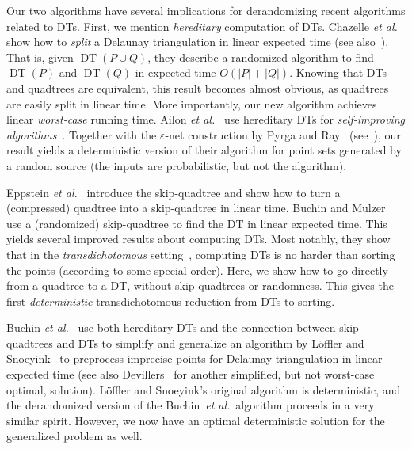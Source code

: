 \documentclass[11pt]{paper}
\newcommand {\etal} {\textit {et al.}}
\newcommand {\eps} {\varepsilon}
\DeclareMathOperator {\DT}{DT}
\begin{document}
    Our two algorithms have several implications for derandomizing recent
    algorithms related to DTs. First,
    we mention \emph{hereditary} computation of DTs.
    Chazelle \etal~\cite {ChazelleDeHuMoSaTe02} show how to \emph{split} a Delaunay
    triangulation in linear expected time (see also~\cite{ChazelleMu11}).
    That is, given $\DT(P \cup Q)$,
    they describe a randomized algorithm to find $\DT(P)$ and
    $\DT(Q)$ in expected time $O(|P| + |Q|)$. Knowing that DTs
    and quadtrees are equivalent, this result becomes almost obvious, as quadtrees
    are easily split in linear time. More importantly, our
    new algorithm achieves linear \emph{worst-case} running time.
Ailon \etal~\cite{AilonChClLiMuSe11} use hereditary
    DTs for 
    \emph{self-improving algorithms}~\cite{AilonChClLiMuSe11}.
    Together with the $\eps$-net construction by Pyrga and Ray~\cite{PyrgaRa08}
    (see~\cite[Appendix~A]{AilonChClLiMuSe11}),
    our result yields a deterministic version of their algorithm for
    point sets generated by a random source (the inputs are probabilistic,
    but not the algorithm).

    Eppstein \etal~\cite {EppsteinGoSu08} introduce the skip-quadtree and show
    how to turn a (compressed) quadtree into a skip-quadtree in linear
    time.  Buchin and Mulzer~\cite{BuchinMu11} use a
    (randomized) skip-quadtree to find the DT in linear
    expected time.
    This yields several improved results
    about computing DTs. Most notably, they show
    that in the \emph{transdichotomous} 
    setting~\cite{ChanPa09,ChanPa10,FredmanWi94}, computing DTs
    is no harder than sorting the points (according to some special order).
    Here, we show how to go directly from a quadtree
    to a DT, without skip-quadtrees or randomness.
    This gives the first \emph{deterministic} transdichotomous reduction from
    DTs to sorting.

    Buchin \etal~\cite {BuchinLoMoMuXX} use both hereditary
    DTs and the connection between skip-quadtrees and DTs
    to simplify and generalize
    an algorithm by L{\"o}ffler and Snoeyink~\cite{LoefflerSn10}
    to preprocess imprecise points for Delaunay triangulation
    in linear expected time (see also Devillers~\cite{Devillers11} for another
    simplified, but not worst-case optimal, solution). L{\"o}ffler and Snoeyink's
    original algorithm is deterministic, and the derandomized version of the
    Buchin~\etal~algorithm proceeds in a very similar spirit. However, we
    now have an optimal deterministic solution for the generalized 
    problem as well.
\end{document}
